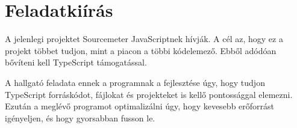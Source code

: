 \chapter*{Feladatkiírás}

\noindent

A jelenlegi projektet Sourcemeter JavaScriptnek hívják.
A cél az, hogy ez a projekt többet tudjon, mint a piacon a többi kódelemező.
Ebből adódóan bővíteni kell TypeScript támogatással.

\noindent

A hallgató feladata ennek a programnak a fejlesztése úgy, hogy tudjon TypeScript forráskódot, fájlokat és projekteket is kellő pontossággal elemezni.
Ezután a meglévő programot optimalizálni úgy, hogy kevesebb erőforrást igényeljen, és hogy gyorsabban fusson le.
